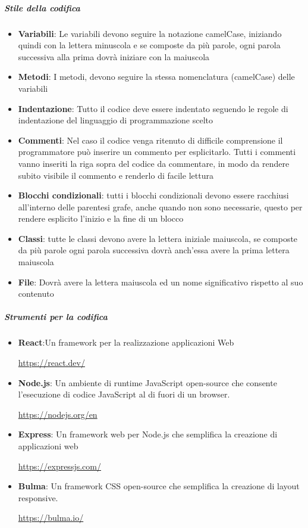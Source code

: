 \documentclass[12pt]{article}
\begin{document}
\subparagraph{Stile della codifica}
\begin{itemize}
    \item \textbf{Variabili}: Le variabili devono seguire la notazione camelCase, iniziando quindi con la lettera minuscola e se composte da più parole, ogni parola successiva alla prima dovrà iniziare con la maiuscola
    \item \textbf{Metodi}: I metodi, devono seguire la stessa nomenclatura (camelCase) delle variabili
    \item \textbf{Indentazione}: Tutto il codice deve essere indentato seguendo le regole di indentazione del linguaggio di programmazione scelto
    \item \textbf{Commenti}: Nel caso il codice venga ritenuto di difficile comprensione il programmatore può inserire un commento per esplicitarlo. Tutti i commenti vanno inseriti la riga sopra del codice da commentare, in modo da rendere subito visibile il commento e renderlo di facile lettura
    \item \textbf{Blocchi condizionali}: tutti i blocchi condizionali devono essere racchiusi all'interno delle parentesi grafe, anche quando non sono necessarie, questo per rendere esplicito l'inizio e la fine di un blocco
    \item \textbf{Classi}: tutte le classi devono avere la lettera iniziale maiuscola, se composte da più parole ogni parola successiva dovrà anch'essa avere la prima lettera maiuscola
    \item \textbf{File}: Dovrà avere la lettera maiuscola ed un nome significativo rispetto al suo contenuto
\end{itemize}


\subparagraph{Strumenti per la codifica}
\begin{itemize}
    \item \textbf{React}:Un framework per la realizzazione applicazioni Web\\
          \begin{center}
              \url{https://react.dev/}
          \end{center}
    \item \textbf{Node.js}: Un ambiente di runtime JavaScript open-source che consente l'esecuzione di codice JavaScript al di fuori di un browser.
          \begin{center}
              \url{https://nodejs.org/en}
          \end{center}
    \item \textbf{Express}: Un framework web per Node.js che semplifica la creazione di applicazioni web\\
          \begin{center}
              \url{https://expressjs.com/}
          \end{center}
    \item \textbf{Bulma}: Un framework CSS open-source che semplifica la creazione di layout responsive.
          \begin{center}
              \url{https://bulma.io/}
          \end{center}
\end{itemize}
\end{document}

